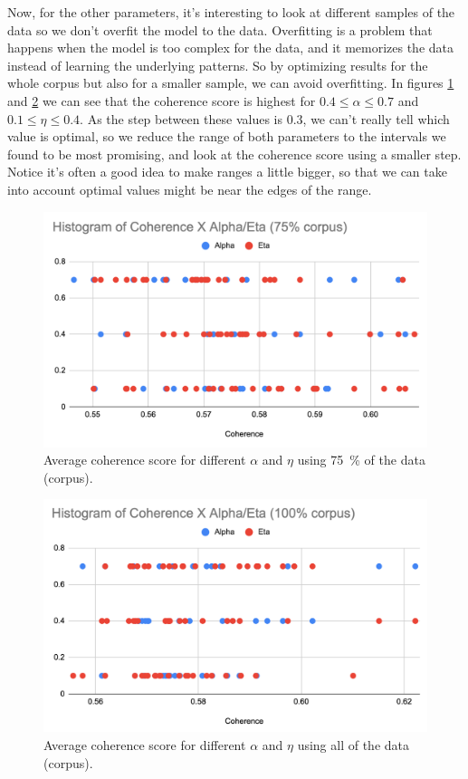 \documentclass[11pt, conference, onecolumn, final]{IEEEtran}
\begin{document}
Now, for the other parameters, it's interesting to look at different samples of
the data so we don't overfit the model to the data.
Overfitting is a problem that happens when the model is too complex for the
data, and it memorizes the data instead of learning the underlying patterns.
So by optimizing results for the whole corpus but also for a smaller sample, we
can avoid overfitting.
In figures \ref{fig:75p-coherenceXalpha-eta} and \ref{fig:100p-coherenceXalpha-eta} we
can see that the coherence score is highest for $0.4 \leqslant \alpha \leqslant
0.7$ and $ 0.1 \leqslant \eta \leqslant 0.4$.
As the step between these values is $0.3$, we can't really tell which value is
optimal, so we reduce the range of both parameters to the intervals we found to
be most promising, and look at the coherence score using a smaller step.
Notice it's often a good idea to make ranges a little bigger, so that we can
take into account optimal values might be near the edges of the range.

\begin{figure}[H]
    \centering
    \includegraphics[width=0.7\linewidth]{75p-coherenceXalpha-eta.png}
    \caption{Average coherence score for different $\alpha$ and $\eta$ using
        \qty{75}{\percent} of the data (corpus).}
    \label{fig:75p-coherenceXalpha-eta}
\end{figure}

\begin{figure}[H]
    \centering
    \includegraphics[width=0.7\linewidth]{100p-coherenceXalpha-eta.png}
    \caption{Average coherence score for different $\alpha$ and $\eta$ using
        all of the data (corpus).}
    \label{fig:100p-coherenceXalpha-eta}
\end{figure}
\end{document}
